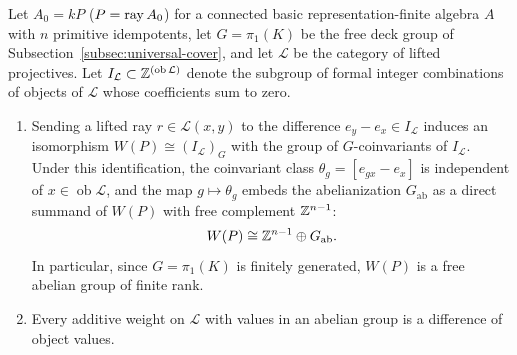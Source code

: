 \begin{proposition}
\label{prop:integral-ray-weights}
Let $A_0=kP$ ($P=\operatorname{ray} A_0$) for a connected basic representation-finite
algebra $A$ with $n$ primitive idempotents, let $G=\pi_1(K)$ be the free deck
group of Subsection~\ref{subsec:universal-cover}, and let $\mathcal L$ be the
category of lifted projectives. Let
$I_{\mathcal L}\subset\mathbb Z^{(\operatorname{ob}\mathcal L)}$ denote the subgroup
of formal integer combinations of objects of $\mathcal L$ whose coefficients
sum to zero.
\begin{enumerate}[label={\upshape(\arabic*)}]
\item Sending a lifted ray $r\in\mathcal L(x,y)$ to the difference
$e_y-e_x\in I_{\mathcal L}$ induces an isomorphism
$W(P)\cong(I_{\mathcal L})_G$ with the group of $G$-coinvariants of
$I_{\mathcal L}$. Under this identification, the coinvariant class
$\theta_g=[e_{gx}-e_x]$ is independent of $x\in\operatorname{ob}\mathcal L$,
and the map $g\mapsto\theta_g$ embeds the abelianization $G_{\mathrm{ab}}$
as a direct summand of $W(P)$ with free complement $\mathbb Z^{n-1}$:
\[
                       W(P)\cong\mathbb Z^{n-1}\oplus G_{\mathrm{ab}}.
\]
In particular, since $G=\pi_1(K)$ is finitely generated, $W(P)$ is a free
abelian group of finite rank.
\item Every additive weight on $\mathcal L$ with values in an abelian group
is a difference of object values.
\end{enumerate}
\end{proposition}
